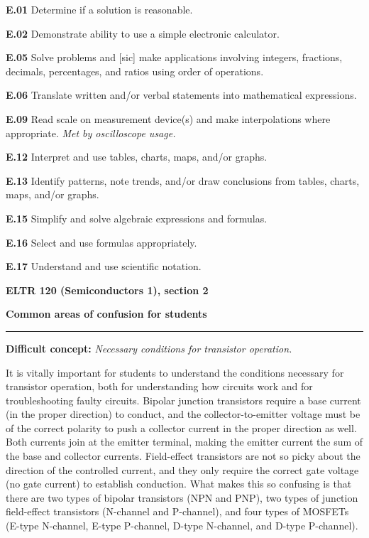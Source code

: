 \item{\bf E.01} Determine if a solution is reasonable.
\item{\bf E.02} Demonstrate ability to use a simple electronic calculator.
\item{\bf E.05} Solve problems and [sic] make applications involving integers, fractions, decimals, percentages, and ratios using order of operations.
\item{\bf E.06} Translate written and/or verbal statements into mathematical expressions.
\item{\bf E.09} Read scale on measurement device(s) and make interpolations where appropriate.  {\it Met by oscilloscope usage.}
\item{\bf E.12} Interpret and use tables, charts, maps, and/or graphs.
\item{\bf E.13} Identify patterns, note trends, and/or draw conclusions from tables, charts, maps, and/or graphs.
\item{\bf E.15} Simplify and solve algebraic expressions and formulas.
\item{\bf E.16} Select and use formulas appropriately.
\item{\bf E.17} Understand and use scientific notation.
\medskip





\vfil \eject

\centerline{\bf ELTR 120 (Semiconductors 1), section 2} \bigskip 
 
\vskip 10pt

\noindent
{\bf Common areas of confusion for students}

\vskip 5pt

\hrule \vskip 5pt

\vskip 10pt

\noindent
{\bf Difficult concept: } {\it Necessary conditions for transistor operation.}

It is vitally important for students to understand the conditions necessary for transistor operation, both for understanding how circuits work and for troubleshooting faulty circuits.  Bipolar junction transistors require a base current (in the proper direction) to conduct, and the collector-to-emitter voltage must be of the correct polarity to push a collector current in the proper direction as well.  Both currents join at the emitter terminal, making the emitter current the sum of the base and collector currents.  Field-effect transistors are not so picky about the direction of the controlled current, and they only require the correct gate voltage (no gate current) to establish conduction.  What makes this so confusing is that there are two types of bipolar transistors (NPN and PNP), two types of junction field-effect transistors (N-channel and P-channel), and four types of MOSFETs (E-type N-channel, E-type P-channel, D-type N-channel, and D-type P-channel).

